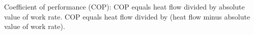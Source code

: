 Coefficient of performance (COP):  
COP equals heat flow divided by absolute value of work rate.  
COP equals heat flow divided by (heat flow minus absolute value of work rate).